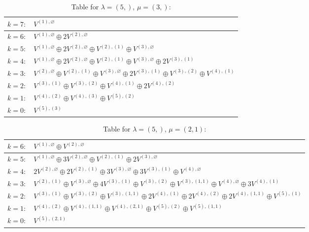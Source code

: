 \documentclass[a4paper,12pt]{article}
\begin{document}
\renewcommand{\arraystretch}{1.6} 
\begin{table}[H]
\centering
\caption{Table for $\lambda = (5,)$, $\mu = (3,)$:}
\begin{tabular}{|>{\centering\arraybackslash}p{15cm}|}
\hline
 $k = 7: \quad V^{(1), \varnothing} $ \\ \hline
 $k = 6: \quad V^{(1), \varnothing} \oplus 2 V^{(2), \varnothing} $ \\ \hline
 $k = 5: \quad V^{(1), \varnothing} \oplus 2 V^{(2), \varnothing} \oplus V^{(2), (1)} \oplus V^{(3), \varnothing} $ \\ \hline
 $k = 4: \quad V^{(1), \varnothing} \oplus 2 V^{(2), \varnothing} \oplus V^{(2), (1)} \oplus V^{(3), \varnothing} \oplus 2 V^{(3), (1)} $ \\ \hline
 $k = 3: \quad V^{(2), \varnothing} \oplus V^{(2), (1)} \oplus V^{(3), \varnothing} \oplus 2 V^{(3), (1)} \oplus V^{(3), (2)} \oplus V^{(4), (1)} $ \\ \hline
 $k = 2: \quad V^{(3), (1)} \oplus V^{(3), (2)} \oplus V^{(4), (1)} \oplus 2 V^{(4), (2)} $ \\ \hline
 $k = 1: \quad V^{(4), (2)} \oplus V^{(4), (3)} \oplus V^{(5), (2)} $ \\ \hline
 $k = 0: \quad V^{(5), (3)} $ \\ \hline
\end{tabular}
\end{table}

\renewcommand{\arraystretch}{1.6} 
\begin{table}[H]
\centering
\caption{Table for $\lambda = (5,)$, $\mu = (2, 1)$:}
\begin{tabular}{|>{\centering\arraybackslash}p{15cm}|}
\hline
 $k = 6: \quad V^{(1), \varnothing} \oplus V^{(2), \varnothing} $ \\ \hline
 $k = 5: \quad V^{(1), \varnothing} \oplus 3 V^{(2), \varnothing} \oplus V^{(2), (1)} \oplus 2 V^{(3), \varnothing} $ \\ \hline
 $k = 4: \quad 2 V^{(2), \varnothing} \oplus 2 V^{(2), (1)} \oplus 3 V^{(3), \varnothing} \oplus 3 V^{(3), (1)} \oplus V^{(4), \varnothing} $ \\ \hline
 $k = 3: \quad V^{(2), (1)} \oplus V^{(3), \varnothing} \oplus 4 V^{(3), (1)} \oplus V^{(3), (2)} \oplus V^{(3), (1, 1)} \oplus V^{(4), \varnothing} \oplus 3 V^{(4), (1)} $ \\ \hline
 $k = 2: \quad V^{(3), (1)} \oplus V^{(3), (2)} \oplus V^{(3), (1, 1)} \oplus 2 V^{(4), (1)} \oplus 2 V^{(4), (2)} \oplus 2 V^{(4), (1, 1)} \oplus V^{(5), (1)} $ \\ \hline
 $k = 1: \quad V^{(4), (2)} \oplus V^{(4), (1, 1)} \oplus V^{(4), (2, 1)} \oplus V^{(5), (2)} \oplus V^{(5), (1, 1)} $ \\ \hline
 $k = 0: \quad V^{(5), (2, 1)} $ \\ \hline
\end{tabular}
\end{table}
\end{document}
